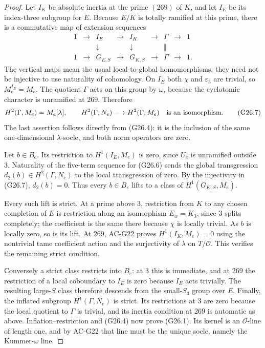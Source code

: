 \begin{proof}
Let $I_K$ be absolute inertia at the prime $(269)$ of $K$,
and let $I_E$ be its index-three subgroup for $E$.
Because $E/K$ is totally ramified at this prime, there is a
commutative map of extension sequences
\[
\begin{array}{ccccccccc}
1&\longrightarrow&I_E&\longrightarrow&I_K&\longrightarrow&\Gamma&\longrightarrow&1\\
 &&\downarrow&&\downarrow&&\Vert\\
1&\longrightarrow&G_{E,S}&\longrightarrow&G_{K,S}&\longrightarrow&\Gamma&\longrightarrow&1.
\end{array}                                             \tag{G26.6}
\]
The vertical maps mean the usual local-to-global homomorphisms;
they need not be injective to use naturality of cohomology.
On $I_E$ both $\chi$ and $\varepsilon_3$ are trivial, so
$M_e^{I_E}=M_e$.  The quotient $\Gamma$ acts on this group
by $\omega$, because the cyclotomic character is unramified
at $269$.  Therefore
\[
 H^2(\Gamma,M_e)=M_e[\lambda],
 \qquad
 H^2(\Gamma,N_e)\longrightarrow H^2(\Gamma,M_e)
 \quad\hbox{is an isomorphism}.                         \tag{G26.7}
\]
The last assertion follows directly from (G26.4): it is the
inclusion of the same one-dimensional $\lambda$-socle, and
both norm operators are zero.

Let $b\in B_e$.  Its restriction to $H^1(I_E,M_e)$ is zero,
since $U_e$ is unramified outside $3$.  Naturality of the
five-term sequence for (G26.6) sends the global transgression
$d_2(b)\in H^2(\Gamma,N_e)$ to the local transgression of
zero.  By the injectivity in (G26.7), $d_2(b)=0$.
Thus every $b\in B_e$ lifts to a class of
$H^1(G_{K,S},M_e)$.

Every such lift is strict.  At a prime above $3$, restriction
from $K$ to any chosen completion of $E$ is restriction along
an isomorphism $E_w=K_3$, since $3$ splits completely; the
coefficient is the same there because $\chi$ is locally trivial.
As $b$ is locally zero, so is its lift.  At $269$, AC-G22
proves $H^1(I_K,M_e)=0$ using the nontrivial tame coefficient
action and the surjectivity of $\lambda$ on $T/\mathcal O$.
This verifies the remaining strict condition.

Conversely a strict class restricts into $B_e$: at $3$ this is
immediate, and at $269$ the restriction of a local coboundary
to $I_E$ is zero because $I_E$ acts trivially.  The resulting
large-$S$ class therefore descends from the small-$S_3$ group
over $E$.  Finally, the inflated subgroup
$H^1(\Gamma,N_e)$ is strict.  Its restrictions at $3$ are zero
because the local quotient to $\Gamma$ is trivial, and its
inertia condition at $269$ is automatic as above.
Inflation--restriction and (G26.4) now prove (G26.1).
Its kernel is an $\mathcal O$-line of length one, and by AC-G22
that line must be the unique socle, namely the Kummer-$\omega$
line.


\end{proof}
